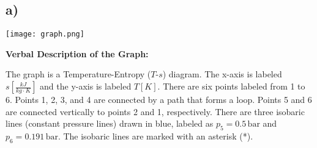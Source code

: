 

\subsection*{a)}

\begin{center}
\texttt{[image: graph.png]}
\end{center}

\textbf{Verbal Description of the Graph:}

The graph is a Temperature-Entropy ($T$-$s$) diagram. The x-axis is labeled $s \left[ \frac{kJ}{kg \cdot K} \right]$ and the y-axis is labeled $T \left[ K \right]$. There are six points labeled from 1 to 6. Points 1, 2, 3, and 4 are connected by a path that forms a loop. Points 5 and 6 are connected vertically to points 2 and 1, respectively. There are three isobaric lines (constant pressure lines) drawn in blue, labeled as $p_5 = 0.5 \, \text{bar}$ and $p_6 = 0.191 \, \text{bar}$. The isobaric lines are marked with an asterisk (*).